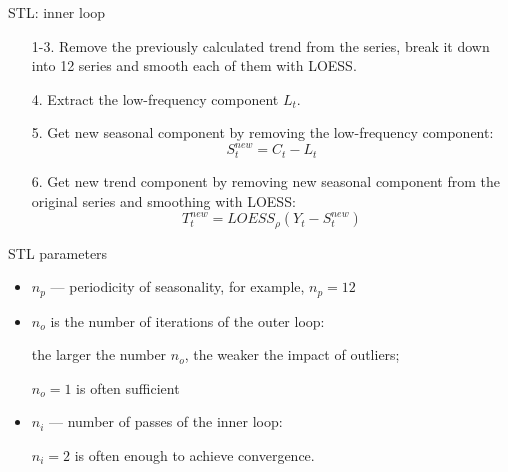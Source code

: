 \begin{frame}{STL: inner loop}
	
	
	\begin{enumerate}		
		
		\item[1-3.] Remove the previously calculated trend from the series, break it down into 12 series and
		smooth each of them with LOESS.
		
		\item[4.] Extract the low-frequency component $L_t$.
		
		
		
	\end{enumerate}
	
	
	\begin{enumerate}[<+->]
		

		\item[5.] Get \alert{new} seasonal component  by removing the low-frequency component:
		\[
		S_t^{new} = C_t - L_t
		\]
		\item[6.] Get new trend component by removing  new seasonal component from the original series and smoothing with LOESS:
		\[
		T_t^{new} = LOESS_{\rho}(Y_t - S_t^{new})
		\]
		
	\end{enumerate}
	
	
\end{frame}




\begin{frame}{STL parameters}
	
	\begin{itemize}[<+->]
		\item $n_p$ — periodicity of seasonality, for example, $n_p=12$
		\item $n_o$ is the number of iterations of the outer loop:
		
		the larger the number $n_o$, the weaker the impact of outliers;
		
		$n_o = 1$ is often sufficient
		
		\item $n_i$ — number of passes of the inner loop:
		
		$n_i = 2$ is often enough to achieve convergence.
	\end{itemize}
	
\end{frame}

